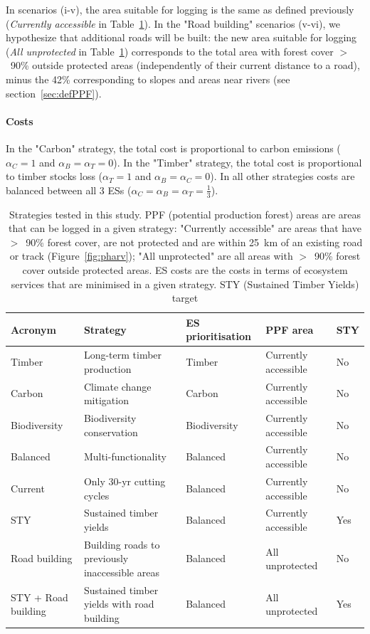 \documentclass{article}
\begin{document}
In scenarios (i-v), the area suitable for logging is the same as defined previously (\textit{Currently accessible} in Table~\ref{tab:strategies}). In the "Road building" scenarios (v-vi), we hypothesize that additional roads will be built: the new area suitable for logging (\textit{All unprotected} in Table~\ref{tab:strategies}) corresponds to the total area with forest cover $>$~90\% outside protected areas (independently of their current distance to a road), minus the 42\% corresponding to slopes and areas near rivers (see section~\ref{sec:defPPF}). 

\paragraph{Costs}

In the "Carbon" strategy, the total cost is proportional to carbon emissions ($\alpha_C=1$ and $\alpha_B=\alpha_T=0$). In the "Timber" strategy, the total cost is proportional to timber stocks loss ($\alpha_T=1$ and $\alpha_B=\alpha_C=0$). In all other strategies costs are balanced between all 3 ESs ($\alpha_C=\alpha_B=\alpha_T=\frac{1}{3}$).

\begin{table}
    \centering
    \begin{tabularx}{\textwidth}{p{2cm} p{3cm} p{2cm} p{2cm} p{0.8cm}}
    \toprule
         Acronym & Strategy & ES prioritisation & PPF area &  STY \\
         \midrule
         Timber & Long-term timber production & Timber  & Currently accessible& No \\
         Carbon & Climate change mitigation &  Carbon & Currently accessible & No \\
         Biodiversity & Biodiversity conservation &  Biodiversity & Currently accessible & No \\
         Balanced & Multi-functionality & Balanced & Currently accessible & No \\
         Current & Only 30-yr cutting cycles & Balanced & Currently accessible & No \\
         STY & Sustained timber yields & Balanced & Currently accessible & Yes \\
         Road building & Building roads to previously inaccessible areas & Balanced & All unprotected & No \\
         STY + Road building & Sustained timber yields with road building & Balanced & All unprotected & Yes \\
         \bottomrule
    \end{tabularx}
    \caption{Strategies tested in this study. PPF (potential production forest) areas are areas that can be logged in a given strategy: "Currently accessible" are areas that have $>$~90\% forest cover, are not protected and are within 25~km of an existing road or track (Figure~\ref{fig:pharv}); "All unprotected" are all areas with $>$~90\% forest cover outside protected areas. ES costs are the costs in terms of ecosystem services that are minimised in a given strategy. STY (Sustained Timber Yields) target }
    \label{tab:strategies}
\end{table}
\end{document}
